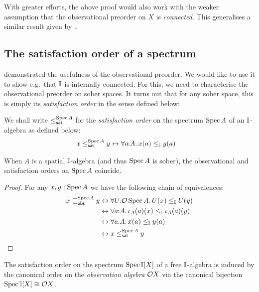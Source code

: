\begin{remark}
  With greater efforts, the above proof would also work with the weaker assumption that the observational preorder on $X$ is \emph{connected}. This generalises a similar result given by \citet[Prop.~4.4.1]{hyland1990first}.
\end{remark}


\subsection{The satisfaction order of a spectrum}

 demonstrated the usefulness of the observational preorder. We would like to use it to show e.g.\ that $\mathbb{I}$ is internally connected. For this, we need to characterise the observational preorder on sober spaces. It turns out that for any sober space, this is simply its \emph{satisfaction order} in the sense defined below:


\begin{definition}
  We shall write $\satle[\spec{A}]$ for the \emph{satisfaction order} on the spectrum $\operatorname{Spec}{A}$ of an $\mathbb{I}$-algebra as defined below:
  \begin{align*}
    x\satle[\spec{A}] y 
    &\eq \fa{a}{A}
    x(a) \le_\I y(a) 
  \end{align*}
\end{definition}


\begin{observation}\label{lem:specorderofsober}
  When $A$ is a spatial $\mathbb{I}$-algebra (and thus $\operatorname{Spec}{A}$ is sober), the observational and satisfaction orders on $\operatorname{Spec}{A}$ coincide.
\end{observation}
\begin{proof}
  For any $x,y:\operatorname{Spec}{A}$ we have the following chain of equivalences:
  \begin{align*}
    x\obsle[\spec{A}] y 
    &\eq 
    \fa{U}{\opens\spec{A}} U(x) \le_{\I} U(y)
    \\ 
    &\eq 
    \fa{a}{A} 
    \iota_A(a)(x)
    \le_\I
    \iota_A(a)(y)
    \\ 
    &\eq 
    \fa{a}{A} 
    x(a)
    \le_\I
    y(a)
    \\ 
    &\eq 
    x\satle[\spec{A}] y
    \qedhere
  \end{align*}
\end{proof}

\begin{observation}
  The satisfaction order on the spectrum $\operatorname{Spec}{\mathbb{I}[X]}$ of a free $\mathbb{I}$-algebra is induced by the canonical order on the \emph{observation algebra} $\mathcal{O}{X}$ via the canonical bijection $\operatorname{Spec}{\mathbb{I}[X]}\cong \mathcal{O}{X}$.
\end{observation}

